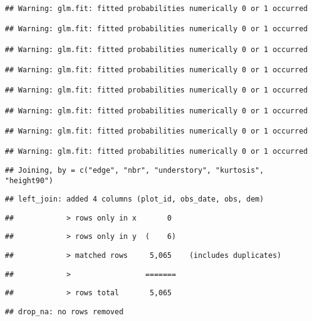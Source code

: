\documentclass[
]{article}
\begin{document}
\begin{verbatim}
## Warning: glm.fit: fitted probabilities numerically 0 or 1 occurred

## Warning: glm.fit: fitted probabilities numerically 0 or 1 occurred

## Warning: glm.fit: fitted probabilities numerically 0 or 1 occurred

## Warning: glm.fit: fitted probabilities numerically 0 or 1 occurred

## Warning: glm.fit: fitted probabilities numerically 0 or 1 occurred

## Warning: glm.fit: fitted probabilities numerically 0 or 1 occurred

## Warning: glm.fit: fitted probabilities numerically 0 or 1 occurred

## Warning: glm.fit: fitted probabilities numerically 0 or 1 occurred
\end{verbatim}

\begin{verbatim}
## Joining, by = c("edge", "nbr", "understory", "kurtosis", "height90")
\end{verbatim}

\begin{verbatim}
## left_join: added 4 columns (plot_id, obs_date, obs, dem)
\end{verbatim}

\begin{verbatim}
##            > rows only in x       0
\end{verbatim}

\begin{verbatim}
##            > rows only in y  (    6)
\end{verbatim}

\begin{verbatim}
##            > matched rows     5,065    (includes duplicates)
\end{verbatim}

\begin{verbatim}
##            >                 =======
\end{verbatim}

\begin{verbatim}
##            > rows total       5,065
\end{verbatim}

\begin{verbatim}
## drop_na: no rows removed
\end{verbatim}
\end{document}
